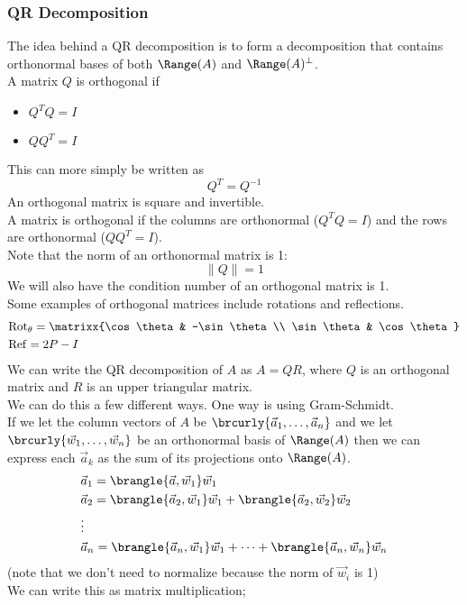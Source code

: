 \subsubsection{QR Decomposition}
The idea behind a QR decomposition is to form a decomposition that contains orthonormal bases of both $\Range(A)$ and $\Range(A)^\perp$.\\
A matrix $Q$ is orthogonal if
\begin{itemize}
    \item $Q^TQ=I$
    \item $QQ^T=I$
\end{itemize}
This can more simply be written as
$$Q^T=Q^{-1}$$
An orthogonal matrix is square and invertible.\\
A matrix is orthogonal if the columns are orthonormal ($Q^TQ=I$) and the rows are orthonormal ($QQ^T=I$).\\
Note that the norm of an orthonormal matrix is 1:
$$\|Q\|=1$$
We will also have the condition number of an orthogonal matrix is 1.\\
Some examples of orthogonal matrices include rotations and reflections.
\begin{align*}
    &\mathrm{Rot}_\theta=\matrixx{\cos\theta & -\sin\theta\\ \sin\theta & \cos\theta}\\
    &\mathrm{Ref}=2P-I
\end{align*}
We can write the QR decomposition of $A$ as $A=QR$, where $Q$ is an orthogonal matrix and $R$ is an upper triangular matrix.\\
We can do this a few different ways. One way is using Gram-Schmidt.\\
If we let the column vectors of $A$ be $\brcurly{\vec{a}_1,\ldots,\vec{a}_n}$ and we let $\brcurly{\vec{w}_1,\ldots,\vec{w}_n}$ be an orthonormal basis of $\Range(A)$ then we can express each $\vec{a}_k$ as the sum of its projections onto $\Range(A)$.
\begin{align*}
    &\vec{a}_1=\brangle{\vec{a},\vec{w}_1}\vec{w}_1\\
    &\vec{a}_2=\brangle{\vec{a}_2,\vec{w}_1}\vec{w}_1+\brangle{\vec{a}_2,\vec{w}_2}\vec{w}_2\\
    &\vdots\\
    &\vec{a}_n=\brangle{\vec{a}_n,\vec{w}_1}\vec{w}_1+\cdots+\brangle{\vec{a}_n,\vec{w}_n}\vec{w}_n
\end{align*}
(note that we don't need to normalize because the norm of $\vec{w}_i$ is 1)\\
We can write this as matrix multiplication;
